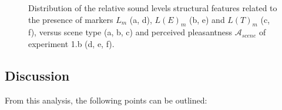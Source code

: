 \documentclass[twoside,twocolumn]{article}
\begin{document}
\begin{figure}[t]
        \caption{Distribution of the relative sound levels structural features related to the presence of markers $L_m$ (a, d), $L(E)_m$ (b, e) and $L(T)_m$ (c, f), versus scene type (a, b, c) and perceived pleasantness $\mathcal{A}_{scene}$ of experiment 1.b (d, e, f).}\label{fig:soundlevelMarker}
\end{figure}

\subsection{Discussion}

From this analysis, the following points can be outlined:
\end{document}
